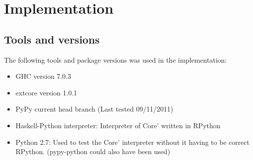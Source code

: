 
\section{Implementation}

\subsection{Tools and versions}

The following tools and package versions was used in the implementation:

\begin{itemize}
\item GHC version 7.0.3
\item extcore version 1.0.1
\item PyPy current head branch (Last tested 09/11/2011)
\item Haskell-Python interpreter: Interpreter of Core' written in RPython
\item Python 2.7: Used to test the Core' interpreter without it having to be correct RPython.
(pypy-python could also have been used)
\end{itemize}







